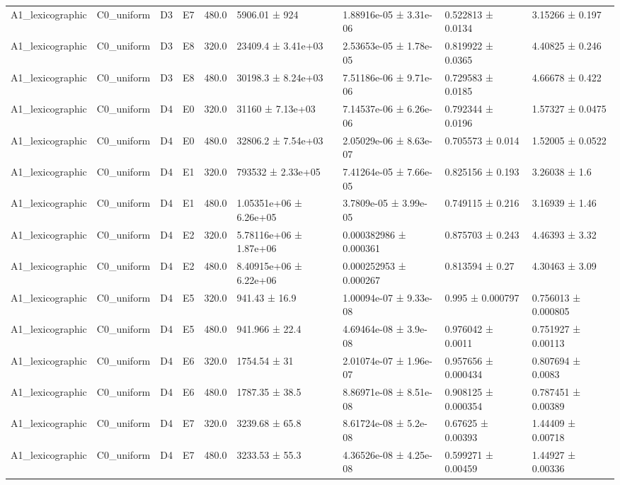 \begin{table}
\begin{tabular}{lllllllll}
A1\_lexicographic & C0\_uniform & D3 & E7 & 480.0 & 5906.01 ± 924 & 1.88916e-05 ± 3.31e-06 & 0.522813 ± 0.0134 & 3.15266 ± 0.197 \\
A1\_lexicographic & C0\_uniform & D3 & E8 & 320.0 & 23409.4 ± 3.41e+03 & 2.53653e-05 ± 1.78e-05 & 0.819922 ± 0.0365 & 4.40825 ± 0.246 \\
A1\_lexicographic & C0\_uniform & D3 & E8 & 480.0 & 30198.3 ± 8.24e+03 & 7.51186e-06 ± 9.71e-06 & 0.729583 ± 0.0185 & 4.66678 ± 0.422 \\
A1\_lexicographic & C0\_uniform & D4 & E0 & 320.0 & 31160 ± 7.13e+03 & 7.14537e-06 ± 6.26e-06 & 0.792344 ± 0.0196 & 1.57327 ± 0.0475 \\
A1\_lexicographic & C0\_uniform & D4 & E0 & 480.0 & 32806.2 ± 7.54e+03 & 2.05029e-06 ± 8.63e-07 & 0.705573 ± 0.014 & 1.52005 ± 0.0522 \\
A1\_lexicographic & C0\_uniform & D4 & E1 & 320.0 & 793532 ± 2.33e+05 & 7.41264e-05 ± 7.66e-05 & 0.825156 ± 0.193 & 3.26038 ± 1.6 \\
A1\_lexicographic & C0\_uniform & D4 & E1 & 480.0 & 1.05351e+06 ± 6.26e+05 & 3.7809e-05 ± 3.99e-05 & 0.749115 ± 0.216 & 3.16939 ± 1.46 \\
A1\_lexicographic & C0\_uniform & D4 & E2 & 320.0 & 5.78116e+06 ± 1.87e+06 & 0.000382986 ± 0.000361 & 0.875703 ± 0.243 & 4.46393 ± 3.32 \\
A1\_lexicographic & C0\_uniform & D4 & E2 & 480.0 & 8.40915e+06 ± 6.22e+06 & 0.000252953 ± 0.000267 & 0.813594 ± 0.27 & 4.30463 ± 3.09 \\
A1\_lexicographic & C0\_uniform & D4 & E5 & 320.0 & 941.43 ± 16.9 & 1.00094e-07 ± 9.33e-08 & 0.995 ± 0.000797 & 0.756013 ± 0.000805 \\
A1\_lexicographic & C0\_uniform & D4 & E5 & 480.0 & 941.966 ± 22.4 & 4.69464e-08 ± 3.9e-08 & 0.976042 ± 0.0011 & 0.751927 ± 0.00113 \\
A1\_lexicographic & C0\_uniform & D4 & E6 & 320.0 & 1754.54 ± 31 & 2.01074e-07 ± 1.96e-07 & 0.957656 ± 0.000434 & 0.807694 ± 0.0083 \\
A1\_lexicographic & C0\_uniform & D4 & E6 & 480.0 & 1787.35 ± 38.5 & 8.86971e-08 ± 8.51e-08 & 0.908125 ± 0.000354 & 0.787451 ± 0.00389 \\
A1\_lexicographic & C0\_uniform & D4 & E7 & 320.0 & 3239.68 ± 65.8 & 8.61724e-08 ± 5.2e-08 & 0.67625 ± 0.00393 & 1.44409 ± 0.00718 \\
A1\_lexicographic & C0\_uniform & D4 & E7 & 480.0 & 3233.53 ± 55.3 & 4.36526e-08 ± 4.25e-08 & 0.599271 ± 0.00459 & 1.44927 ± 0.00336 \\

\end{tabular}
\end{table}
